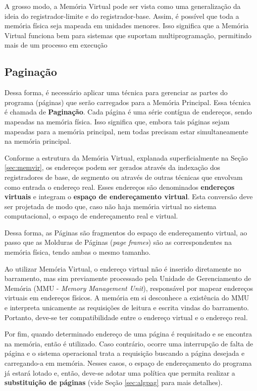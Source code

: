 A grosso modo, a Memória Virtual pode ser vista como uma generalização da ideia do registrador-limite e do registrador-base. Assim, é possível que toda a memória física seja mapeada em unidades menores. Isso significa que a Memória Virtual funciona bem para sistemas que suportam multiprogramação, permitindo mais de um processo em execução

\subsection{Paginação}

Dessa forma, é necessário aplicar uma técnica para gerenciar as partes do programa (páginas) que serão carregados para a Memória Principal. Essa técnica é chamada de \textbf{Paginação}. Cada página é uma série contígua de endereços, sendo mapeadas na memória física. Isso significa que, embora tais páginas sejam mapeadas para a memória principal, nem todas precisam estar simultaneamente na memória principal.

Conforme a estrutura da Memória Virtual, explanada superficialmente na Seção \ref{sec:memvir}, os endereços podem ser gerados através da indexação dos registradores de base, de segmento ou através de outras técnicas que envolvam como entrada o endereço real. Esses endereços são denominados \textbf{endereços virtuais} e integram o \textbf{espaço de endereçamento virtual}. Esta conversão deve ser projetada de modo que, caso não haja memória virtual no sistema computacional, o espaço de endereçamento real e virtual.

Dessa forma, as Páginas são fragmentos do espaço de endereçamento virtual, ao passo que as Molduras de Páginas (\textit{page frames}) são as correspondentes na memória física, tendo ambas o mesmo tamanho.

Ao utilizar Memória Virtual, o endereço virtual não é inserido diretamente no barramento, mas sim previamente processado pela Unidade de Gerenciamento de Memória (MMU - \textit{Memory Management Unit}), responsável por mapear endereços virtuais em endereços físicos. A memória em si desconhece a existência do MMU e interpreta unicamente as requisições de leitura e escrita vindas do barramento. Portanto, deve-se ter compatibilidade entre o endereço virtual e o endereço real.

Por fim, quando determinado endereço de uma página é requisitado e se encontra na memória, então é utilizado. Caso contrário, ocorre uma interrupção de falta de página e o sistema operacional trata a requisição buscando a página desejada e carregando-a em memória. Nesses casos, o espaço de endereçamento do programa já estará lotado e, então, deve-se adotar uma política que permita realizar a \textbf{substituição de páginas} (vide Seção \ref{sec:algpag} para mais detalhes).

